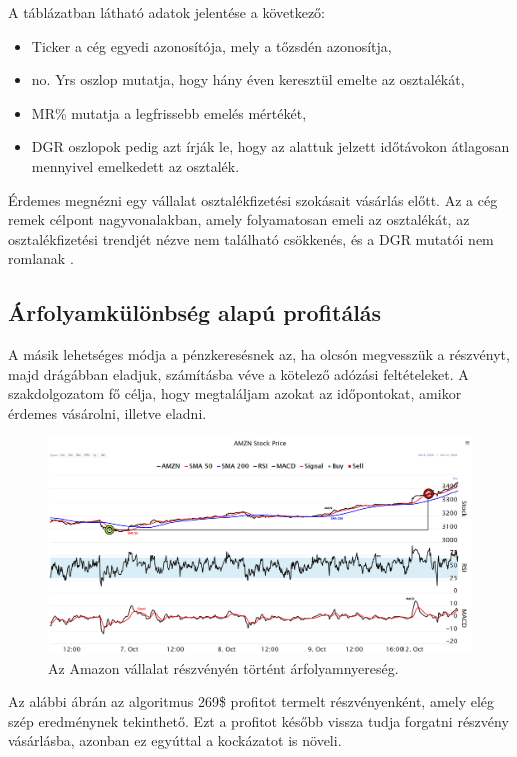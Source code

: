 \noindent A táblázatban látható adatok jelentése a következő:
\begin{itemize}
  \item Ticker a cég egyedi azonosítója, mely a tőzsdén azonosítja,
  \item no. Yrs oszlop mutatja, hogy hány éven keresztül emelte az osztalékát,
  \item MR\% mutatja a legfrissebb emelés mértékét,
  \item DGR oszlopok pedig azt írják le, hogy az alattuk jelzett időtávokon átlagosan mennyivel emelkedett az osztalék.
\end{itemize}
Érdemes megnézni egy vállalat osztalékfizetési szokásait vásárlás előtt. Az a cég remek célpont nagyvonalakban, amely folyamatosan emeli az osztalékát, az osztalékfizetési trendjét nézve nem található csökkenés, és a DGR mutatói nem romlanak \cite{solyomi2017}.

\subsection{Árfolyamkülönbség alapú profitálás}
A másik lehetséges módja a pénzkeresésnek az, ha olcsón megvesszük a részvényt, majd drágábban eladjuk, számításba véve a kötelező adózási feltételeket. A szakdolgozatom fő célja, hogy megtaláljam azokat az időpontokat, amikor érdemes vásárolni, illetve eladni.
\begin{figure}[ht]
\centering
\includegraphics[width=\textwidth]{images/AMZN_profit.png}
\caption{Az Amazon vállalat részvényén történt árfolyamnyereség.}
\label{fig:AMZN_profit}
\end{figure}
Az alábbi ábrán az algoritmus 269\$ profitot termelt részvényenként, amely elég szép eredménynek tekinthető. Ezt a profitot később vissza tudja forgatni részvény vásárlásba, azonban ez egyúttal a kockázatot is növeli.

